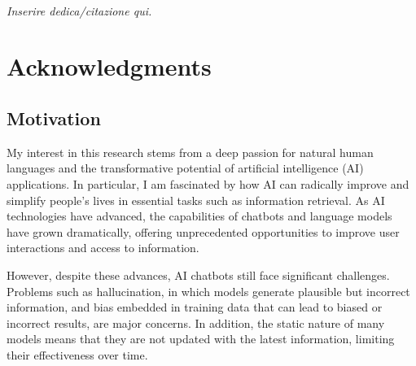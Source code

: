 
\LogoWidth{7cm} %

\begin{titlepage}
    \pagestyle{empty}
    \makefrontpage
    \restoregeometry
\end{titlepage}

\frontmatter
~ \newpage
\null{}
\begin{flushright}
    \textit{Inserire dedica/citazione qui.}
\end{flushright}
\null

\chapter*{Acknowledgments}

\section*{Motivation}

My interest in this research stems from a deep passion for natural human languages and the transformative potential of artificial intelligence (AI) applications. In particular, I am fascinated by how AI can radically improve and simplify people's lives in essential tasks such as information retrieval. As AI technologies have advanced, the capabilities of chatbots and language models have grown dramatically, offering unprecedented opportunities to improve user interactions and access to information.

However, despite these advances, AI chatbots still face significant challenges. Problems such as hallucination, in which models generate plausible but incorrect information, and bias embedded in training data that can lead to biased or incorrect results, are major concerns. In addition, the static nature of many models means that they are not updated with the latest information, limiting their effectiveness over time.


